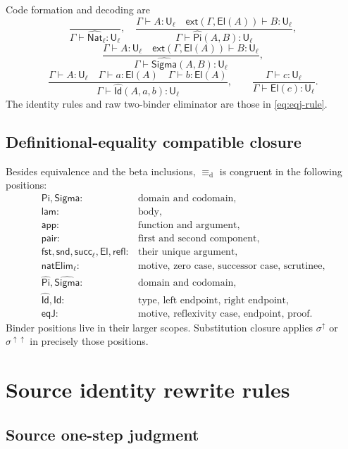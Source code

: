 \documentclass[10pt,reqno]{amsart}
\newcommand{\Ext}[2]{\mathsf{ext}(#1,#2)}
\newcommand{\Sort}{\mathsf{U}}
\newcommand{\PiTy}{\mathsf{Pi}}
\newcommand{\SigmaTy}{\mathsf{Sigma}}
\newcommand{\Lam}{\mathsf{lam}}
\newcommand{\App}{\mathsf{app}}
\newcommand{\Pair}{\mathsf{pair}}
\newcommand{\Fst}{\mathsf{fst}}
\newcommand{\Snd}{\mathsf{snd}}
\newcommand{\Succ}{\mathsf{succ}}
\newcommand{\NatElim}{\mathsf{natElim}}
\newcommand{\CodeNat}{\widehat{\mathsf{Nat}}}
\newcommand{\CodePi}{\widehat{\mathsf{Pi}}}
\newcommand{\CodeSigma}{\widehat{\mathsf{Sigma}}}
\newcommand{\CodeId}{\widehat{\mathsf{Id}}}
\newcommand{\El}{\mathsf{El}}
\newcommand{\IdTy}{\mathsf{Id}}
\newcommand{\Refl}{\mathsf{refl}}
\newcommand{\EqJ}{\mathsf{eqJ}}
\newcommand{\defeq}{\mathrel{\equiv_{\mathrm d}}}
\newcommand{\lift}{\uparrow}
\begin{document}
Code formation and decoding are
\[
\frac{}{\Gamma\vdash\CodeNat_\ell:\Sort_\ell},
\quad
\frac{\Gamma\vdash A:\Sort_\ell\quad
      \Ext{\Gamma}{\El(A)}\vdash B:\Sort_\ell}
     {\Gamma\vdash\CodePi(A,B):\Sort_\ell},
\]
\[
\frac{\Gamma\vdash A:\Sort_\ell\quad
      \Ext{\Gamma}{\El(A)}\vdash B:\Sort_\ell}
     {\Gamma\vdash\CodeSigma(A,B):\Sort_\ell},
\]
\[
\frac{\Gamma\vdash A:\Sort_\ell\quad
      \Gamma\vdash a:\El(A)\quad\Gamma\vdash b:\El(A)}
     {\Gamma\vdash\CodeId(A,a,b):\Sort_\ell},
\qquad
\frac{\Gamma\vdash c:\Sort_\ell}
     {\Gamma\vdash\El(c):\Sort_\ell}.
\tag{A.6}\label{eq:code-rules}
\]
The identity rules and raw two-binder eliminator are those in
\eqref{eq:eqj-rule}.

\subsection{Definitional-equality compatible closure}

Besides equivalence and the beta inclusions, \(\defeq\) is congruent in the
following positions:
\[
\begin{array}{ll}
\PiTy,\SigmaTy:&\text{domain and codomain},\\
\Lam:&\text{body},\\
\App:&\text{function and argument},\\
\Pair:&\text{first and second component},\\
\Fst,\Snd,\Succ_\ell,\El,\Refl:&\text{their unique argument},\\
\NatElim_\ell:&\text{motive, zero case, successor case, scrutinee},\\
\CodePi,\CodeSigma:&\text{domain and codomain},\\
\CodeId,\IdTy:&\text{type, left endpoint, right endpoint},\\
\EqJ:&\text{motive, reflexivity case, endpoint, proof}.
\end{array}
\tag{A.7}\label{eq:defeq-congruence}
\]
Binder positions live in their larger scopes.  Substitution closure applies
\(\sigma^\lift\) or \(\sigma^{\lift\lift}\) in precisely those positions.

\section{Source identity rewrite rules}
\label{app:rewrites}

\subsection{Source one-step judgment}
\end{document}

